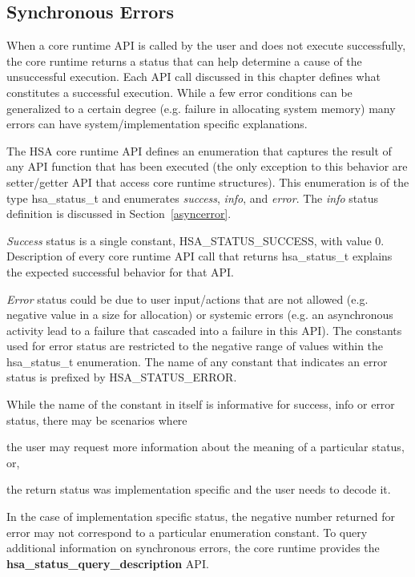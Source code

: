 \documentclass[final]{book}
\newcommand{\reffun}[1]{\textbf{#1}}
\newcommand{\reftyp}[1]{#1}
\newcommand{\refenu}[1]{\reftyp{#1}}
\begin{document}
\hypertarget{syncerror}{}\subsection{Synchronous Errors }\label{syncerror}

When a core runtime API is called by the user and does not execute successfully,
the core runtime returns a status that can help determine a cause of the
unsuccessful execution. Each API call discussed in this chapter defines what
constitutes a successful execution. While a few error conditions can be
generalized to a certain degree (e.g. failure in allocating system memory) many
errors can have system/implementation specific explanations.

The HSA core runtime API defines an enumeration that captures the result of any
API function that has been executed (the only exception to this behavior are
setter/getter API that access core runtime structures). This enumeration is of
the type \reftyp{hsa_status_t} and enumerates \textit{success}, \textit{info},
and \textit{error}. The \textit{info} status definition is discussed in
Section~\ref{asyncerror}.

\textit{Success} status is a single constant, \refenu{HSA_STATUS_SUCCESS},
with value 0. Description of every core runtime API call that returns
\reftyp{hsa_status_t} explains the expected successful behavior for that API.

\textit{Error} status could be due to user input/actions that are not allowed
(e.g. negative value in a size for allocation) or systemic errors (e.g. an
asynchronous activity lead to a failure that cascaded into a failure in this
API). The constants used for error status are restricted to the negative range
of values within the \reftyp{hsa_status_t} enumeration. The name of any constant
that indicates an error status is prefixed by \refenu{HSA_STATUS_ERROR}.

While the name of the constant in itself is informative for success, info or
error status, there may be scenarios where\begin{inparaenum}[(i)]\item the user
  may request more information about the meaning of a particular status,
  or, \item the return status was implementation specific and the user needs to
  decode it.
\end{inparaenum} In the case of implementation specific status, the negative
number returned for error may not correspond to a particular enumeration
constant. To query additional information on synchronous errors, the core
runtime provides the \reffun{hsa_status_query_description} API.
\end{document}
